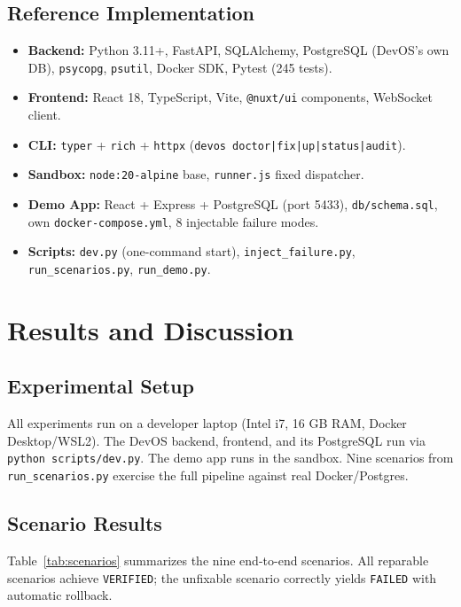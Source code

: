 \documentclass[conference,10pt,caption=false]{IEEEtran}
\begin{document}
\subsection{Reference Implementation}
\label{sec:implementation}
\begin{itemize}[leftmargin=*, nosep]
    \item \textbf{Backend:} Python 3.11+, FastAPI, SQLAlchemy, PostgreSQL (DevOS's own DB), \texttt{psycopg}, \texttt{psutil}, Docker SDK, Pytest (245 tests).
    \item \textbf{Frontend:} React 18, TypeScript, Vite, \texttt{@nuxt/ui} components, WebSocket client.
    \item \textbf{CLI:} \texttt{typer} + \texttt{rich} + \texttt{httpx} (\texttt{devos doctor|fix|up|status|audit}).
    \item \textbf{Sandbox:} \texttt{node:20-alpine} base, \texttt{runner.js} fixed dispatcher.
    \item \textbf{Demo App:} React + Express + PostgreSQL (port 5433), \texttt{db/schema.sql}, own \texttt{docker-compose.yml}, 8 injectable failure modes.
    \item \textbf{Scripts:} \texttt{dev.py} (one-command start), \texttt{inject\_failure.py}, \texttt{run\_scenarios.py}, \texttt{run\_demo.py}.
\end{itemize}

\section{Results and Discussion}
\label{sec:results}

\subsection{Experimental Setup}
All experiments run on a developer laptop (Intel i7, 16 GB RAM, Docker Desktop/WSL2). The DevOS backend, frontend, and its PostgreSQL run via \texttt{python scripts/dev.py}. The demo app runs in the sandbox. Nine scenarios from \texttt{run\_scenarios.py} exercise the full pipeline against real Docker/Postgres.

\subsection{Scenario Results}
Table~\ref{tab:scenarios} summarizes the nine end-to-end scenarios. All reparable scenarios achieve \texttt{VERIFIED}; the unfixable scenario correctly yields \texttt{FAILED} with automatic rollback.
\end{document}
